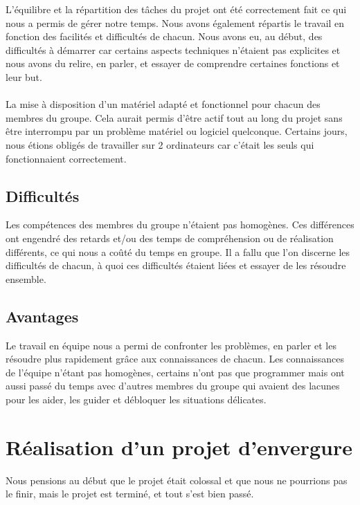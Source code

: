 \documentclass[12pt]{article}
\begin{document}
	L'équilibre et la répartition des tâches du projet ont été correctement fait ce qui nous a permis de gérer notre temps. Nous avons également répartis le travail en fonction des facilités et difficultés de chacun. Nous avons eu, au début, des difficultés à démarrer car certains aspects techniques n'étaient pas explicites et nous avons du relire, en parler, et essayer de comprendre certaines fonctions et leur but.\\\\
	La mise à disposition d'un matériel adapté et fonctionnel pour chacun des membres du groupe. Cela aurait permis d'être actif tout au long du projet sans être interrompu par un problème matériel ou logiciel quelconque. Certains jours, nous étions obligés de travailler sur 2 ordinateurs car c'était les seuls qui fonctionnaient correctement.

\subsection{Difficultés}

Les compétences des membres du groupe n'étaient pas homogènes. Ces différences ont engendré des retards et/ou des temps de compréhension ou de réalisation différents, ce qui nous a coûté du temps en groupe. Il a fallu que l'on discerne les difficultés de chacun, à quoi ces difficultés étaient liées et essayer de les résoudre ensemble.

\subsection{Avantages}

Le travail en équipe nous a permi de confronter les problèmes, en parler et les résoudre plus rapidement grâce aux connaissances de chacun. Les connaissances de l'équipe n'étant pas homogènes, certains n'ont pas que programmer mais ont aussi passé du temps avec d'autres membres du groupe qui avaient des lacunes pour les aider, les guider et débloquer les situations délicates.

\newpage

\section{Réalisation d'un projet d'envergure}

Nous pensions au début que le projet était colossal et que nous ne pourrions pas le finir, mais le projet est terminé, et tout s'est bien passé.
\end{document}
